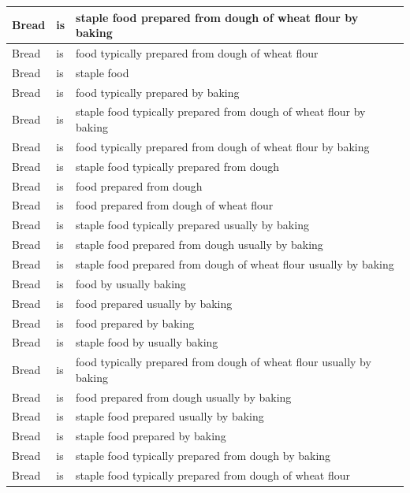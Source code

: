 \documentclass[12pt]{article}
\theoremstyle{grammarstyle}
\begin{document}
\begin{longtable}{|l|l|p{8cm}|}
    Bread    &	is	&    staple food prepared from dough of wheat flour by baking \\
    \hline
    Bread    &	is	&    food typically prepared from dough of wheat flour \\
    \hline
    Bread    &	is	&    staple food \\
    \hline
    Bread    &	is	&    food typically prepared by baking \\
    \hline
    Bread    &	is	&    staple food typically prepared from dough of wheat flour by baking \\
    \hline
    Bread    &	is	&    food typically prepared from dough of wheat flour by baking \\
    \hline
    Bread    &	is	&    staple food typically prepared from dough \\
    \hline
    Bread    &	is	&    food prepared from dough \\
    \hline
    Bread    &	is	&    food prepared from dough of wheat flour \\
    \hline
    Bread    &	is	&    staple food typically prepared usually by baking \\
    \hline
    Bread    &	is	&    staple food prepared from dough usually by baking \\
    \hline
    Bread    &	is	&    staple food prepared from dough of wheat flour usually by baking \\
    \hline
    Bread    &	is &    food by	usually baking \\
    \hline
    Bread    &	is	&    food prepared usually by baking \\
    \hline
    Bread    &	is	&    food prepared by baking \\
    \hline
    Bread    &	is &    staple food by	usually baking \\
    \hline
    Bread    &	is	&    food typically prepared from dough of wheat flour usually by baking \\
    \hline
    Bread    &	is	&    food prepared from dough usually by baking \\
    \hline
    Bread    &	is	&    staple food prepared usually by baking \\
    \hline
    Bread    &	is	&    staple food prepared by baking \\
    \hline
    Bread    &	is	&    staple food typically prepared from dough by baking \\
    \hline
    Bread    &	is	&    staple food typically prepared from dough of wheat flour \\

\end{longtable}
\end{document}
